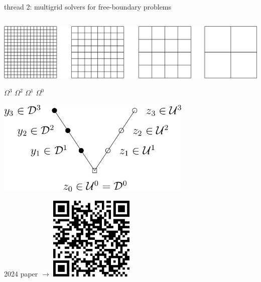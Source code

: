 \documentclass[svgnames,
               hyperref={colorlinks,citecolor=DeepPink4,linkcolor=FireBrick,urlcolor=Maroon},
               usepdftitle=false]  %
               {beamer}
\begin{document}
\begin{frame}{thread 2: multigrid solvers for free-boundary problems}
\begin{columns}
\begin{column}{0.4\textwidth}
{\vspace{5mm}
\includegraphics[width=\textwidth]{figs/mg-grids.png}

{\tiny
\hspace{3mm} $\Omega^3$ \hspace{9mm} $\Omega^2$ \hspace{9mm} $\Omega^1$ \hspace{9mm} $\Omega^0$ \hspace{1mm}
}

\vspace{5mm}
\includegraphics[width=0.7\textwidth]{figs/fascd-vcycle.png}\par}

\vspace{5mm}
\hfill {\tiny 2024 paper $\to$} \quad \href{https://epubs.siam.org/doi/10.1137/23M1594200}{\includegraphics[width=0.3\textwidth]{figs/QRbuelerfarrell.png}}
\end{column}
\end{columns}
\end{frame}
\end{document}
